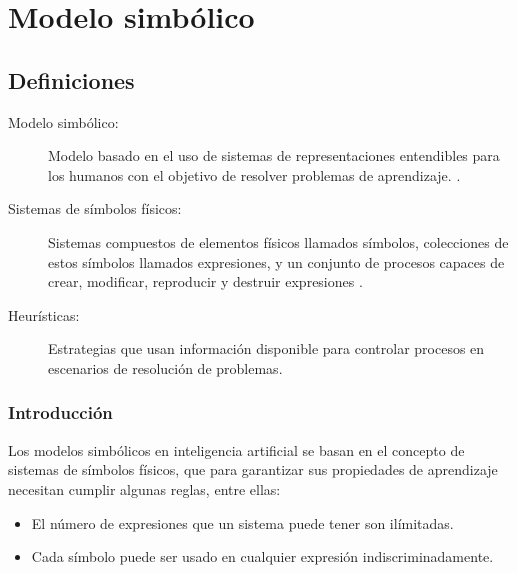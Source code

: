 \chapter{Modelo simb\'olico}

\ifpdf
    \graphicspath{{Chapter3/Figs/Raster/}{Chapter3/Figs/PDF/}{Chapter3/Figs/}}
\else
    \graphicspath{{Chapter3/Figs/Vector/}{Chapter3/Figs/}}
\fi

\section{Definiciones}

\begin{description}
\item[Modelo simb\'olico:] Modelo basado en el uso de sistemas de representaciones entendibles para los humanos con el objetivo de resolver problemas de aprendizaje. \citet{GARNELO201917}.
\item[Sistemas de s\'imbolos f\'isicos:] Sistemas compuestos de elementos f\'isicos llamados s\'imbolos, colecciones de estos s\'imbolos llamados expresiones, y un conjunto de procesos capaces de crear, modificar, reproducir y destruir expresiones \citet{newell197603}.
\item[Heur\'isticas:] Estrategias que usan informaci\'on disponible para controlar procesos en escenarios de resoluci\'on de problemas\citet{pearl1984}.
\end{description}

\subsection{Introducci\'on}

Los modelos simb\'olicos en inteligencia artificial se basan en el concepto de sistemas de s\'imbolos f\'isicos, que para garantizar sus propiedades de aprendizaje necesitan cumplir algunas reglas, entre ellas:

\begin{itemize}
    \item El n\'umero de expresiones que un sistema puede tener son il\'imitadas.
    \item Cada s\'imbolo puede ser usado en cualquier expresi\'on indiscriminadamente.
\end{itemize}

